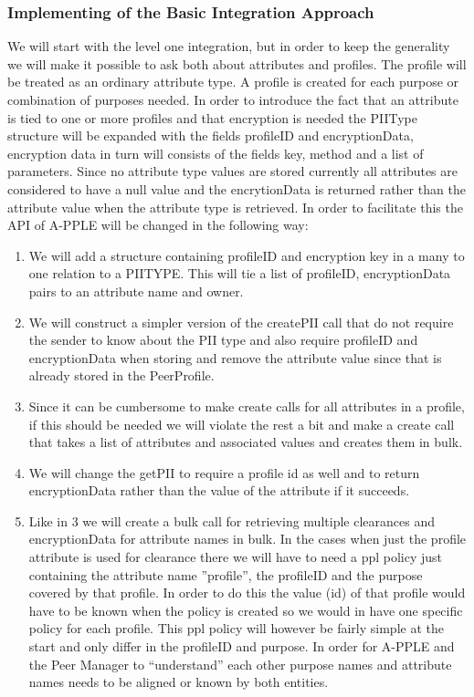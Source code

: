 \subsubsection{Implementing of the Basic Integration Approach}
We will start with the level one integration, but in order to keep the generality we will make it possible to ask both about attributes and profiles. The profile will be treated as an ordinary attribute type. A profile is created for each purpose or combination of purposes needed.
In order to introduce the fact that an attribute is tied to one or more profiles and that encryption is needed the PIIType structure will be expanded with the fields profileID and encryptionData, encryption data in turn will consists of the fields  key, method and a list of parameters. Since no attribute type values are stored currently all attributes are considered to have a null value and the encrytionData is returned rather than the attribute value when the attribute type is retrieved.
In order to facilitate this the API of A-PPLE will be changed in the following way:
\begin{enumerate}
	\item We will add a structure containing profileID and encryption key in a many to one  relation to a PIITYPE. This will tie a list of profileID, encryptionData pairs to an attribute name and owner.
	\item We will construct a simpler version of the createPII call that do not require the sender to know about the PII type and also require profileID and encryptionData when storing and remove the attribute value since that is already stored in the PeerProfile.
	\item Since it can be cumbersome to make create calls for all attributes in a profile, if this should be needed we will violate the rest a bit and make a create call that takes a list of attributes and associated values and creates them in bulk. 
	\item We will change the getPII to require a profile id as well and to return encryptionData rather than the value of the attribute if it succeeds.
	\item  Like in 3 we will create a bulk call for retrieving multiple clearances and encryptionData for attribute names in bulk.
In the cases when just the profile attribute is used for clearance there we will have to need a ppl policy just containing the attribute name ”profile”, the profileID and the purpose covered by that profile. In order to do this the value (id) of that profile would have to be known when the policy is created so we would in have one specific policy for each profile. This ppl policy will however be fairly simple at the start and only differ in the profileID and purpose.
In order for A-PPLE and the Peer Manager to “understand” each other purpose names and attribute names needs to be aligned or known by both entities. 
\end{enumerate}